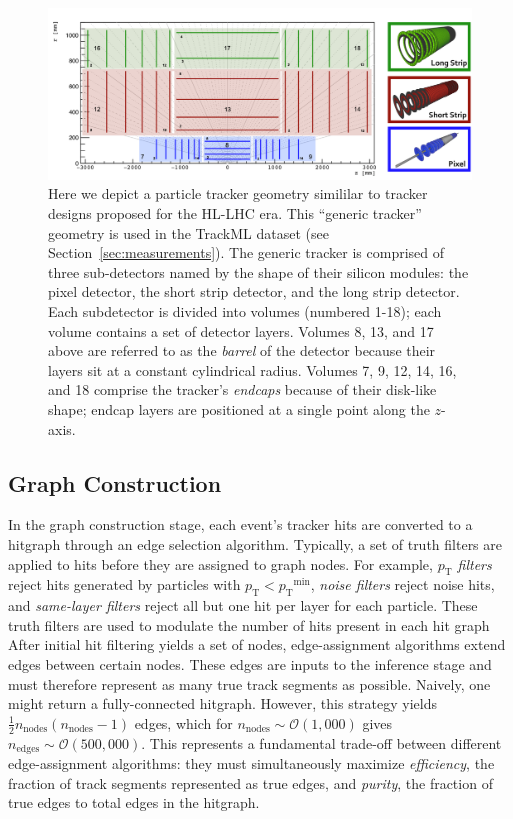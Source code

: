 \documentclass[twocolumn]{svjour3}
\newcommand{\pt}{\ensuremath{p_{\mathrm{T}}}\xspace}
\newcommand{\nnodes}{\ensuremath{n_\mathrm{nodes}\xspace}}
\newcommand{\nedges}{\ensuremath{n_\mathrm{edges}\xspace}}
\begin{document}
\begin{figure}[!htbp]
\centering
\captionsetup{labelfont=bf}
\includegraphics[width=0.99\columnwidth,clip]{pixel_detector.pdf}
\caption{Here we depict a particle tracker geometry simililar to tracker designs proposed for the HL-LHC era. 
This ``generic tracker'' geometry is used in the TrackML dataset (see Section~\ref{sec:measurements}). The generic tracker is comprised of three sub-detectors named by the shape of their silicon modules: the pixel detector, the short strip detector, and the long strip detector. 
Each subdetector is divided into volumes (numbered 1-18); each volume contains a set of detector layers. Volumes 8, 13, and 17 above are referred to as the \textit{barrel} of the detector because their layers sit at a constant cylindrical radius. 
Volumes 7, 9, 12, 14, 16, and 18 comprise the tracker's \textit{endcaps} because of their disk-like shape; endcap layers are positioned at a single point along the $z$-axis.}
\label{fig:pixel} 
\end{figure}
 
\subsection{Graph Construction}
\label{sec:Graph}
In the graph construction stage, each event's tracker hits are converted to a hitgraph through an edge selection algorithm. 
Typically, a set of truth filters are applied to hits before they are assigned to graph nodes. 
For example, \textit{$\pt$ filters} reject hits generated by particles with $\pt<\pt^\mathrm{min}$, \textit{noise filters} reject noise hits, and \textit{same-layer filters} reject all but one hit per layer for each particle. 
These truth filters are used to modulate the number of hits present in each hit graph
After initial hit filtering yields a set of nodes, edge-assignment algorithms extend edges between certain nodes. 
These edges are inputs to the inference stage and must therefore represent as many true track segments as possible. 
Naively, one might return a fully-connected hitgraph. 
However, this strategy yields $\frac{1}{2}\nnodes(\nnodes-1)$ edges, which for $\nnodes\sim\mathcal{O}(1,000)$ gives $\nedges\sim\mathcal{O}(500,000)$. 
This represents  a fundamental trade-off between different edge-assignment algorithms: they must simultaneously maximize \textit{efficiency}, the fraction of track segments represented as true edges, and \textit{purity}, the fraction of true edges to total edges in the hitgraph.
\end{document}
